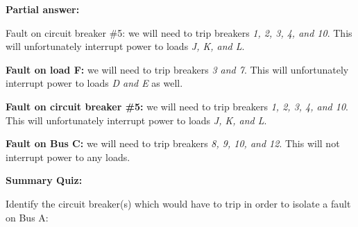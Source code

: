 \vskip 10pt







\noindent
{\bf Partial answer:}

\vskip 10pt

Fault on circuit breaker \#5: we will need to trip breakers {\it 1, 2, 3, 4, and 10}.  This will unfortunately interrupt power to loads {\it J, K, and L}.
 






{\bf Fault on load F:} we will need to trip breakers {\it 3 and 7}.  This will unfortunately interrupt power to loads {\it D and E} as well.

\vskip 10pt

{\bf Fault on circuit breaker \#5:} we will need to trip breakers {\it 1, 2, 3, 4, and 10}.  This will unfortunately interrupt power to loads {\it J, K, and L}.
 
\vskip 10pt

{\bf Fault on Bus C:} we will need to trip breakers {\it 8, 9, 10, and 12}.  This will not interrupt power to any loads.












\vfil \eject

\noindent
{\bf Summary Quiz:}

Identify the circuit breaker(s) which would have to trip in order to isolate a fault on Bus A:


